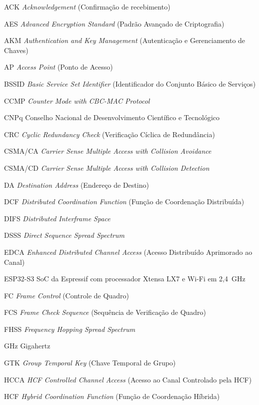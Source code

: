 \begin{siglas}
\item[ACK] \textit{Acknowledgement} (Confirmação de recebimento)
\item[AES] \textit{Advanced Encryption Standard} (Padrão Avançado de Criptografia)
\item[AKM] \textit{Authentication and Key Management} (Autenticação e Gerenciamento de Chaves)
\item[AP] \textit{Access Point} (Ponto de Acesso)
\item[BSSID] \textit{Basic Service Set Identifier} (Identificador do Conjunto Básico de Serviços)
\item[CCMP] \textit{Counter Mode with CBC-MAC Protocol}
\item[CNPq] Conselho Nacional de Desenvolvimento Científico e Tecnológico
\item[CRC] \textit{Cyclic Redundancy Check} (Verificação Cíclica de Redundância)
\item[CSMA/CA] \textit{Carrier Sense Multiple Access with Collision Avoidance}
\item[CSMA/CD] \textit{Carrier Sense Multiple Access with Collision Detection}
\item[DA] \textit{Destination Address} (Endereço de Destino)
\item[DCF] \textit{Distributed Coordination Function} (Função de Coordenação Distribuída)
\item[DIFS] \textit{Distributed Interframe Space}
\item[DSSS] \textit{Direct Sequence Spread Spectrum}
\item[EDCA] \textit{Enhanced Distributed Channel Access} (Acesso Distribuído Aprimorado ao Canal)
\item[ESP32-S3] SoC da Espressif com processador Xtensa LX7 e Wi-Fi em 2,4~GHz
\item[FC] \textit{Frame Control} (Controle de Quadro)
\item[FCS] \textit{Frame Check Sequence} (Sequência de Verificação de Quadro)
\item[FHSS] \textit{Frequency Hopping Spread Spectrum}
\item[GHz] Gigahertz
\item[GTK] \textit{Group Temporal Key} (Chave Temporal de Grupo)
\item[HCCA] \textit{HCF Controlled Channel Access} (Acesso ao Canal Controlado pela HCF)
\item[HCF] \textit{Hybrid Coordination Function} (Função de Coordenação Híbrida)

\end{siglas}

